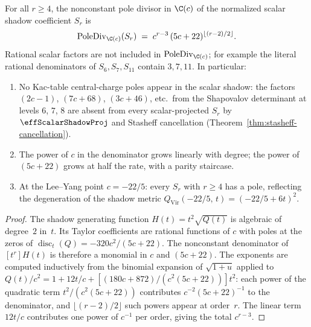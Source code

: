 \begin{proposition}
\label{prop:denominator-formula}%
%
For all \(r\ge4\), the nonconstant pole divisor in \(\C(c)\) of the
normalized scalar shadow coefficient \(S_r\) is
\begin{equation}\label{eq:denominator-formula}
\operatorname{PoleDiv}_{\C(c)}(S_r)
\;=\;
c^{r-3}\,(5c+22)^{\lfloor(r-2)/2\rfloor}.
\end{equation}
Rational scalar factors are not included in
\(\operatorname{PoleDiv}_{\C(c)}\); for example the literal rational
denominators of \(S_6,S_7,S_{11}\) contain \(3,7,11\).
In particular:
\begin{enumerate}[label=\textup{(\roman*)}]
\item No Kac-table central-charge poles appear in the scalar shadow:
 the factors
 $(2c-1)$, $(7c+68)$, $(3c+46)$, etc.\ from the
 Shapovalov determinant at levels $6$, $7$, $8$
 are absent from every scalar-projected \(S_r\) by
 \(\effScalarShadowProj\) and
 Stasheff cancellation
 \textup{(}Theorem~\textup{\ref{thm:stasheff-cancellation})}.
\item The power of $c$ in the denominator grows linearly
 with degree; the power of $(5c+22)$ grows at half the rate,
 with a parity staircase.
\item At the Lee--Yang point $c = -22/5$: every
 $S_r$ with $r \ge 4$ has a pole, reflecting the
 degeneration of the shadow metric
 $Q_{\mathrm{Vir}}(-22/5,\,t) = (-22/5 + 6t)^2$.
\end{enumerate}
\end{proposition}

\begin{proof}
The shadow generating function $H(t) = t^2\sqrt{Q(t)}$
is algebraic of degree~$2$ in~$t$. Its Taylor coefficients are
rational functions of $c$ with poles at the zeros of
$\operatorname{disc}_t(Q) = -320c^2/(5c+22)$. The
nonconstant denominator of $[t^r]H(t)$ is therefore a monomial in $c$ and
$(5c+22)$. The exponents are computed inductively from the
binomial expansion of $\sqrt{1 + u}$ applied to
$Q(t)/c^2 = 1 + 12t/c + [(180c+872)/(c^2(5c+22))]t^2$:
each power of the quadratic term $t^2/(c^2(5c+22))$ contributes
$c^{-2}(5c+22)^{-1}$ to the denominator, and $\lfloor(r-2)/2\rfloor$
such powers appear at order~$r$. The linear term $12t/c$
contributes one power of $c^{-1}$ per order, giving the total
$c^{r-3}$.
\end{proof}


